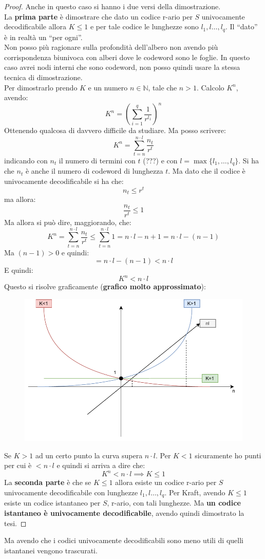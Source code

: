 \documentclass[a4paper,12pt, oneside]{book}
\begin{document}
\begin{proof}
  Anche in questo caso si hanno i due versi della dimostrazione.\\
  La \textbf{prima parte} è dimostrare che dato un codice r-ario per $S$
  univocamente decodificabile allora $K\leq 1$ e per tale codice le lunghezze
  sono $l_1,l\dots,l_q$. Il ``dato'' è in realtà un ``per ogni''.\\
  Non posso più ragionare sulla profondità dell'albero non avendo più
  corrispondenza biunivoca con alberi dove le codeword sono le foglie. In questo
  caso avrei nodi interni che sono codeword, non posso quindi usare la stessa
  tecnica di dimostrazione.\\
  Per dimostrarlo prendo $K$ e un numero $n\in\mathbb{N}$, tale che
  $n>1$. Calcolo $K^n$, avendo:
  \[K^n=\left(\sum_{i=1}^q\frac{1}{r^{l_1}}\right)^n\]
  Ottenendo qualcosa di davvero difficile da studiare. Ma posso scrivere:
  \[K^n=\sum_{t=n}^{n\cdot l}\frac{n_t}{r^{t}}\]
  indicando con $n_t$ il numero di termini con $t$ (???) e con
  $l=\max\{l_1,\ldots,l_q\}$. Si ha che $n_t$ è anche il numero di codeword di
  lunghezza $t$. Ma dato che il codice è univocamente decodificabile si ha che:
  \[n_t\leq r^t\]
  ma allora:
  \[\frac{n_t}{r^{t}}\leq 1\]
  Ma allora si può dire, maggiorando, che:
  \[K^n=\sum_{t=n}^{n\cdot l}\frac{n_t}{r^{t}}\leq \sum_{t=n}^{n\cdot
      l}1=n\cdot l-n+1=n\cdot l-(n-1)\]
  Ma $(n-1)>0$ e quindi:
  \[=n\cdot l-(n-1) < n\cdot l\]
  E quindi:
  \[K^n<n\cdot l\]
  \newpage
  Questo si risolve graficamente (\textbf{grafico molto approssimato}):
  \begin{figure}[H]
    \centering
    \includegraphics[scale = 0.8]{img/grap.pdf}
  \end{figure}
  Se $K>1$ ad un certo punto la curva supera $n\cdot l$. Per $K<1$ sicuramente
  ho punti per cui è $<n\cdot l$ e quindi si arriva a dire che:
  \[K^n<n\cdot l\implies K\leq 1\]
  La \textbf{seconda parte} è che se $K\leq 1$ allora esiste un codice r-ario
  per $S$ univocamente decodificabile con lunghezze $l_1,l\dots,l_q$. Per Kraft,
  avendo $K\leq 1$ esiste un codice istantaneo per $S$, r-ario, con tali
  lunghezze. Ma \textbf{un codice istantaneo è univocamente decodificabile},
  avendo quindi dimostrato la tesi.
\end{proof}
Ma avendo che i codici univocamente decodificabili sono meno utili di quelli
istantanei vengono trascurati.
\end{document}
